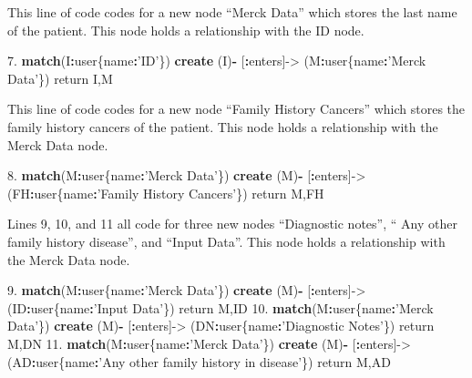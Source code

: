 \documentclass[]{book}
\newenvironment{Shaded}{\begin{snugshade}}{\end{snugshade}}
\newcommand{\KeywordTok}[1]{\textcolor[rgb]{0.13,0.29,0.53}{\textbf{#1}}}
\newcommand{\FloatTok}[1]{\textcolor[rgb]{0.00,0.00,0.81}{#1}}
\newcommand{\StringTok}[1]{\textcolor[rgb]{0.31,0.60,0.02}{#1}}
\newcommand{\OperatorTok}[1]{\textcolor[rgb]{0.81,0.36,0.00}{\textbf{#1}}}
\newcommand{\NormalTok}[1]{#1}
\begin{document}
This line of code codes for a new node ``Merck Data'' which stores the
last name of the patient. This node holds a relationship with the ID
node.

\begin{Shaded}
\begin{Highlighting}[]
\FloatTok{7.} \KeywordTok{match}\NormalTok{(I}\OperatorTok{:}\NormalTok{user\{name}\OperatorTok{:}\StringTok{'ID'}\NormalTok{\}) }\KeywordTok{create}\NormalTok{ (I)}\OperatorTok{-}\StringTok{ }\NormalTok{[}\OperatorTok{:}\NormalTok{enters]->}\StringTok{ }\NormalTok{(M}\OperatorTok{:}\NormalTok{user\{name}\OperatorTok{:}\StringTok{'Merck Data'}\NormalTok{\}) return I,M}
\end{Highlighting}
\end{Shaded}

This line of code codes for a new node ``Family History Cancers'' which
stores the family history cancers of the patient. This node holds a
relationship with the Merck Data node.

\begin{Shaded}
\begin{Highlighting}[]
\FloatTok{8.} \KeywordTok{match}\NormalTok{(M}\OperatorTok{:}\NormalTok{user\{name}\OperatorTok{:}\StringTok{'Merck Data'}\NormalTok{\}) }\KeywordTok{create}\NormalTok{ (M)}\OperatorTok{-}\StringTok{ }\NormalTok{[}\OperatorTok{:}\NormalTok{enters]->}\StringTok{ }\NormalTok{(FH}\OperatorTok{:}\NormalTok{user\{name}\OperatorTok{:}\StringTok{'Family History Cancers'}\NormalTok{\}) return M,FH}
\end{Highlighting}
\end{Shaded}

Lines 9, 10, and 11 all code for three new nodes ``Diagnostic notes'',
`` Any other family history disease'', and ``Input Data''. This node
holds a relationship with the Merck Data node.

\begin{Shaded}
\begin{Highlighting}[]
\FloatTok{9.}  \KeywordTok{match}\NormalTok{(M}\OperatorTok{:}\NormalTok{user\{name}\OperatorTok{:}\StringTok{'Merck Data'}\NormalTok{\}) }\KeywordTok{create}\NormalTok{ (M)}\OperatorTok{-}\StringTok{ }\NormalTok{[}\OperatorTok{:}\NormalTok{enters]->}\StringTok{ }\NormalTok{(ID}\OperatorTok{:}\NormalTok{user\{name}\OperatorTok{:}\StringTok{'Input Data'}\NormalTok{\}) return M,ID}
\FloatTok{10.} \KeywordTok{match}\NormalTok{(M}\OperatorTok{:}\NormalTok{user\{name}\OperatorTok{:}\StringTok{'Merck Data'}\NormalTok{\}) }\KeywordTok{create}\NormalTok{ (M)}\OperatorTok{-}\StringTok{ }\NormalTok{[}\OperatorTok{:}\NormalTok{enters]->}\StringTok{ }\NormalTok{(DN}\OperatorTok{:}\NormalTok{user\{name}\OperatorTok{:}\StringTok{'Diagnostic Notes'}\NormalTok{\}) return M,DN}
\FloatTok{11.} \KeywordTok{match}\NormalTok{(M}\OperatorTok{:}\NormalTok{user\{name}\OperatorTok{:}\StringTok{'Merck Data'}\NormalTok{\}) }\KeywordTok{create}\NormalTok{ (M)}\OperatorTok{-}\StringTok{ }\NormalTok{[}\OperatorTok{:}\NormalTok{enters]->}\StringTok{ }\NormalTok{(AD}\OperatorTok{:}\NormalTok{user\{name}\OperatorTok{:}\StringTok{'Any other family history in disease'}\NormalTok{\}) return M,AD}
\end{Highlighting}
\end{Shaded}
\end{document}
